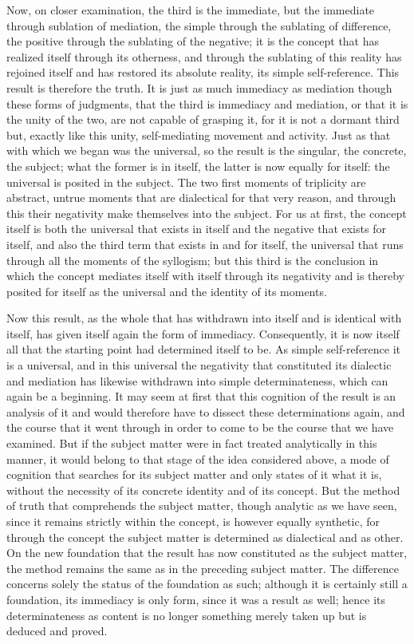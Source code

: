 Now, on closer examination, the third is the immediate,
but the immediate through sublation of mediation,
the simple through the sublating of difference,
the positive through the sublating of the negative;
it is the concept that has realized itself through its otherness,
and through the sublating of this reality has rejoined itself
and has restored its absolute reality,
its simple self-reference.
This result is therefore the truth.
It is just as much immediacy as mediation
though these forms of judgments,
that the third is immediacy and mediation,
or that it is the unity of the two,
are not capable of grasping it,
for it is not a dormant third
but, exactly like this unity,
self-mediating movement and activity.
Just as that with which we began was the universal,
so the result is the singular, the concrete, the subject;
what the former is in itself, the latter is now equally for itself:
the universal is posited in the subject.
The two first moments of triplicity are abstract,
untrue moments that are dialectical for that very reason,
and through this their negativity make themselves into the subject.
For us at first, the concept itself is
both the universal that exists in itself
and the negative that exists for itself,
and also the third term that exists in and for itself,
the universal that runs through all the moments of the syllogism;
but this third is the conclusion in which
the concept mediates itself with itself through its negativity
and is thereby posited for itself as the universal
and the identity of its moments.

Now this result, as the whole that has withdrawn into itself
and is identical with itself, has given itself again
the form of immediacy.
Consequently, it is now itself all that
the starting point had determined itself to be.
As simple self-reference it is a universal,
and in this universal the negativity that
constituted its dialectic and mediation has
likewise withdrawn into simple determinateness,
which can again be a beginning.
It may seem at first that this cognition of the result
is an analysis of it
and would therefore have to dissect these determinations again,
and the course that it went through in order to come to be
the course that we have examined.
But if the subject matter were in fact treated analytically in this manner,
it would belong to that stage of the idea considered above,
a mode of cognition that searches for its subject matter
and only states of it what it is,
without the necessity of its concrete identity and of its concept.
But the method of truth that comprehends the subject matter,
though analytic as we have seen,
since it remains strictly within the concept,
is however equally synthetic,
for through the concept the subject matter is
determined  as dialectical and as other.
On the new foundation that the result
has now constituted as the subject matter,
the method remains the same as in the preceding subject matter.
The difference concerns solely the status of the foundation as such;
although it is certainly still a foundation,
its immediacy is only form,
since it was a result as well;
hence its determinateness as content is
no longer something merely taken up
but is deduced and proved.

